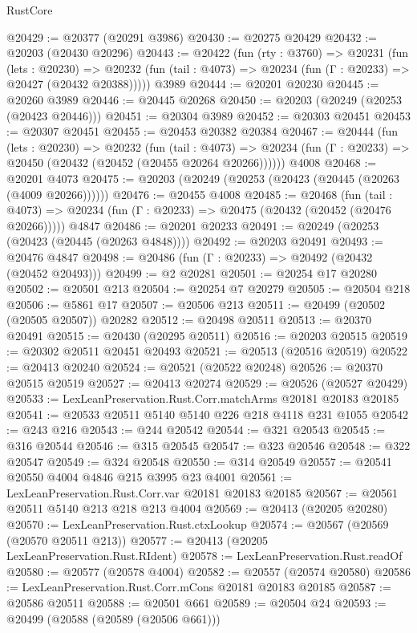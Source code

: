 \begin{lexlean}{RustCore}
\begin{coremodule}
@20429 := @20377 (@20291 @3986)
@20430 := @20275 @20429
@20432 := @20203 (@20430 @20296)
@20443 := @20422
    (fun (rty : @3760) =>
    @20231
      (fun (lets : @20230) =>
      @20232 (fun (tail : @4073) => @20234 (fun (Γ : @20233) => @20427 (@20432 @20388)))))
    @3989
@20444 := @20201 @20230
@20445 := @20260 @3989
@20446 := @20445 @20268
@20450 := @20203 (@20249 (@20253 (@20423 @20446)))
@20451 := @20304 @3989
@20452 := @20303 @20451
@20453 := @20307 @20451
@20455 := @20453 @20382 @20384
@20467 := @20444
    (fun (lets : @20230) =>
    @20232
      (fun (tail : @4073) =>
      @20234 (fun (Γ : @20233) => @20450 (@20432 (@20452 (@20455 @20264 @20266))))))
    @4008
@20468 := @20201 @4073
@20475 := @20203 (@20249 (@20253 (@20423 (@20445 (@20263 (@4009 @20266))))))
@20476 := @20455 @4008
@20485 := @20468
    (fun (tail : @4073) => @20234 (fun (Γ : @20233) => @20475 (@20432 (@20452 (@20476 @20266)))))
    @4847
@20486 := @20201 @20233
@20491 := @20249 (@20253 (@20423 (@20445 (@20263 @4848))))
@20492 := @20203 @20491
@20493 := @20476 @4847
@20498 := @20486 (fun (Γ : @20233) => @20492 (@20432 (@20452 @20493)))
@20499 := @2 @20281
@20501 := @20254 @17 @20280
@20502 := @20501 @213
@20504 := @20254 @7 @20279
@20505 := @20504 @218
@20506 := @5861 @17
@20507 := @20506 @213
@20511 := @20499 (@20502 (@20505 @20507)) @20282
@20512 := @20498 @20511
@20513 := @20370 @20491
@20515 := @20430 (@20295 @20511)
@20516 := @20203 @20515
@20519 := @20302 @20511 @20451 @20493
@20521 := @20513 (@20516 @20519)
@20522 := @20413 @20240
@20524 := @20521 (@20522 @20248)
@20526 := @20370 @20515 @20519
@20527 := @20413 @20274
@20529 := @20526 (@20527 @20429)
@20533 := LexLeanPreservation.Rust.Corr.matchArms @20181 @20183 @20185
@20541 := @20533 @20511 @5140 @5140 @226 @218 @4118 @231 @1055
@20542 := @243 @216
@20543 := @244 @20542
@20544 := @321 @20543
@20545 := @316 @20544
@20546 := @315 @20545
@20547 := @323 @20546
@20548 := @322 @20547
@20549 := @324 @20548
@20550 := @314 @20549
@20557 := @20541 @20550 @4004 @4846 @215 @3995 @23 @4001
@20561 := LexLeanPreservation.Rust.Corr.var @20181 @20183 @20185
@20567 := @20561 @20511 @5140 @213 @218 @213 @4004
@20569 := @20413 (@20205 @20280)
@20570 := LexLeanPreservation.Rust.ctxLookup
@20574 := @20567 (@20569 (@20570 @20511 @213))
@20577 := @20413 (@20205 LexLeanPreservation.Rust.RIdent)
@20578 := LexLeanPreservation.Rust.readOf
@20580 := @20577 (@20578 @4004)
@20582 := @20557 (@20574 @20580)
@20586 := LexLeanPreservation.Rust.Corr.mCons @20181 @20183 @20185
@20587 := @20586 @20511
@20588 := @20501 @661
@20589 := @20504 @24
@20593 := @20499 (@20588 (@20589 (@20506 @661)))

\end{coremodule}
\end{lexlean}
